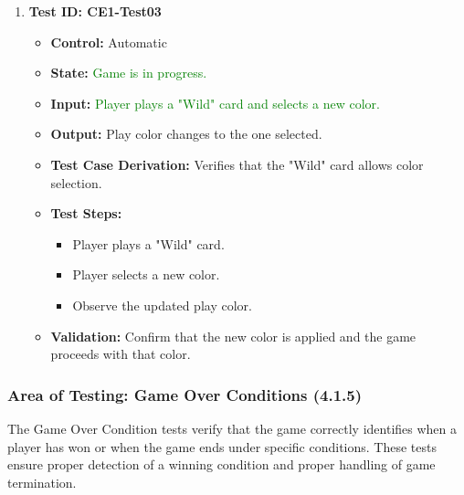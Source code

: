 \documentclass[12pt]{article}
\newcommand{\added}[1]{\textcolor{green}{#1}}
\begin{document}
\begin{enumerate}
    \item \textbf{Test ID: CE1-Test03}
    \begin{itemize}
        \item \textbf{Control:} Automatic
        \item \textbf{State:} \added{Game is in progress.}
        \item \textbf{Input:} \added{Player plays a "Wild" card and selects a new color.}
        \item \textbf{Output:} Play color changes to the one selected.
        \item \textbf{Test Case Derivation:} Verifies that the "Wild" card allows color selection.
        \item \textbf{Test Steps:}
        \begin{itemize}
            \item Player plays a "Wild" card.
            \item Player selects a new color.
            \item Observe the updated play color.
        \end{itemize}
        \item \textbf{Validation:} Confirm that the new color is applied and the game proceeds with that color.
    \end{itemize}
\end{enumerate}

\subsubsection{Area of Testing: Game Over Conditions (4.1.5)}

The Game Over Condition tests verify that the game correctly identifies when a player has won or when the game ends under specific conditions. These tests ensure proper detection of a winning condition and proper handling of game termination.
\end{document}
